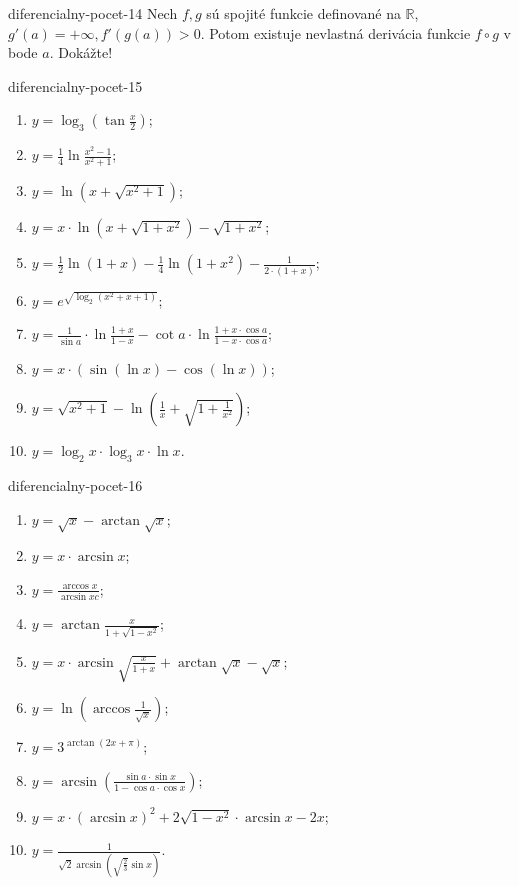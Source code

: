 \begin{defproblem}{diferencialny-pocet-14}
Nech $f,g$ sú spojité funkcie definované na $\mathbb{R}$, $g'(a)=+\infty,f'(g(a))>0$. Potom existuje nevlastná derivácia funkcie $f \circ g$ v bode $a$. Dokážte!
\end{defproblem}

\begin{defproblem}{diferencialny-pocet-15}
\begin{enumerate}
    \item $y=\log_{3}(\tan \frac{x}{2})$;
    \item $y=\frac{1}{4}\ln \frac{x^2-1}{x^2+1}$;
    \item $y=\ln (x+\sqrt{x^2+1})$;
    \item $y=x\cdot\ln (x+\sqrt{1+x^2})-\sqrt{1+x^2}$;
    \item $y=\frac{1}{2} \ln (1+x)-\frac{1}{4} \ln (1+x^2)-\frac{1}{2\cdot(1+x)}$;
    \item $y=e^{\sqrt{\log_2(x^2+x+1)}}$;
    \item $y=\frac{1}{\sin a}\cdot\ln \frac{1+x}{1-x}-\cot a\cdot\ln \frac{1+x\cdot\cos a}{1-x\cdot\cos a}$;
    \item $y=x\cdot(\sin(\ln x)-\cos(\ln x))$;
    \item $y=\sqrt{x^2+1}-\ln (\frac{1}{x}+\sqrt{1+\frac{1}{x^2}})$;
    \item $y=\log_2 x\cdot\log_3 x\cdot\ln x$.
\end{enumerate}
\end{defproblem}

\begin{defproblem}{diferencialny-pocet-16}
\begin{enumerate}
    \item $y=\sqrt{x}-\arctan\sqrt{x}$;
    \item $y=x\cdot\arcsin x$;
    \item $y=\frac{\arccos x}{\arcsin xc}$;
    \item $y=\arctan \frac{x}{1+\sqrt{1-x^2}}$;
    \item $y=x\cdot\arcsin \sqrt{\frac{x}{1+x}}+\arctan \sqrt{x}-\sqrt{x}$;
    \item $y=\ln (\arccos \frac{1}{\sqrt{x}})$;
    \item $y=3^{\arctan(2x+\pi)}$;
    \item $y=\arcsin(\frac{\sin a\cdot \sin x}{1-\cos a\cdot\cos x})$;
    \item $y=x\cdot(\arcsin x)^2+2\sqrt{1-x^2}\cdot\arcsin x-2x$;
    \item $y=\frac{1}{\sqrt{2}\arcsin(\sqrt{\frac{2}{3}}\sin x)}$.
\end{enumerate}
\end{defproblem}

